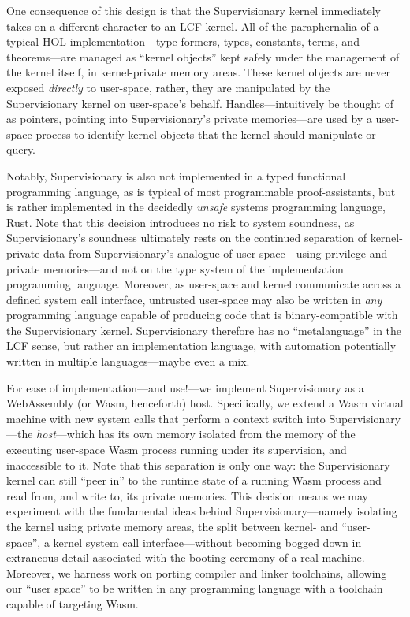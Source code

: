 \documentclass[a4paper, UKenglish, cleveref, autoref, thm-restate, colorlinks]{lipics-v2021}
\begin{document}
One consequence of this design is that the Supervisionary kernel immediately takes on a different character to an LCF kernel.
All of the paraphernalia of a typical HOL implementation---type-formers, types, constants, terms, and theorems---are managed as ``kernel objects'' kept safely under the management of the kernel itself, in kernel-private memory areas.
These kernel objects are never exposed \emph{directly} to user-space, rather, they are manipulated by the Supervisionary kernel on user-space's behalf.
Handles---intuitively be thought of as pointers, pointing into Supervisionary's private memories---are used by a user-space process to identify kernel objects that the kernel should manipulate or query.

Notably, Supervisionary is also not implemented in a typed functional programming language, as is typical of most programmable proof-assistants, but is rather implemented in the decidedly \emph{unsafe} systems programming language, Rust.
Note that this decision introduces no risk to system soundness, as Supervisionary's soundness ultimately rests on the continued separation of kernel-private data from Supervisionary's analogue of user-space---using privilege and private memories---and not on the type system of the implementation programming language.
Moreover, as user-space and kernel communicate across a defined system call interface, untrusted user-space may also be written in \emph{any} programming language capable of producing code that is binary-compatible with the Supervisionary kernel.
Supervisionary therefore has no ``metalanguage'' in the LCF sense, but rather an implementation language, with automation potentially written in multiple languages---maybe even a mix.

For ease of implementation---and use!---we implement Supervisionary as a WebAssembly (or Wasm, henceforth) host.
Specifically, we extend a Wasm virtual machine with new system calls that perform a context switch into Supervisionary---the \emph{host}---which has its own memory isolated from the memory of the executing user-space Wasm process running under its supervision, and inaccessible to it.
Note that this separation is only one way: the Supervisionary kernel can still ``peer in'' to the runtime state of a running Wasm process and read from, and write to, its private memories.
This decision means we may experiment with the fundamental ideas behind Supervisionary---namely isolating the kernel using private memory areas, the split between kernel- and ``user-space'', a kernel system call interface---without becoming bogged down in extraneous detail associated with the booting ceremony of a real machine.
Moreover, we harness work on porting compiler and linker toolchains, allowing our ``user space'' to be written in any programming language with a toolchain capable of targeting Wasm.
\end{document}
